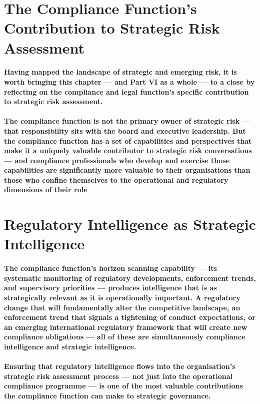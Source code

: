\section{The Compliance Function's Contribution to Strategic Risk Assessment}
\paragraph{Having mapped the landscape of strategic and emerging risk, it is worth bringing this chapter — and Part VI as a whole — to a close by reflecting on the compliance and legal function's specific contribution to strategic risk assessment.}
\paragraph{The compliance function is not the primary owner of strategic risk — that responsibility sits with the board and executive leadership. But the compliance function has a set of capabilities and perspectives that make it a uniquely valuable contributor to strategic risk conversations — and compliance professionals who develop and exercise those capabilities are significantly more valuable to their organisations than those who confine themselves to the operational and regulatory dimensions of their role}

\section{Regulatory Intelligence as Strategic Intelligence}
\paragraph{The compliance function's horizon scanning capability — its systematic monitoring of regulatory developments, enforcement trends, and supervisory priorities — produces intelligence that is as strategically relevant as it is operationally important. A regulatory change that will fundamentally alter the competitive landscape, an enforcement trend that signals a tightening of conduct expectations, or an emerging international regulatory framework that will create new compliance obligations — all of these are simultaneously compliance intelligence and strategic intelligence.}
\paragraph{Ensuring that regulatory intelligence flows into the organisation's strategic risk assessment process — not just into the operational compliance programme — is one of the most valuable contributions the compliance function can make to strategic governance.}

